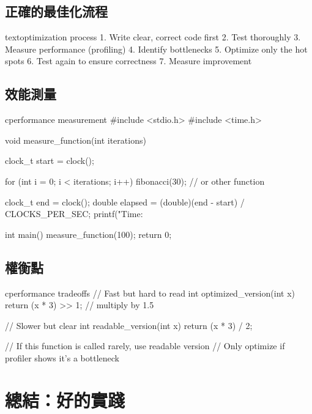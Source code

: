 \subsection*{正確的最佳化流程}

\begin{code}{text}{optimization process}
1. Write clear, correct code first
2. Test thoroughly
3. Measure performance (profiling)
4. Identify bottlenecks
5. Optimize only the hot spots
6. Test again to ensure correctness
7. Measure improvement
\end{code}

\subsection*{效能測量}

\begin{code}{c}{performance measurement}
#include <stdio.h>
#include <time.h>

void measure_function(int iterations) {
    clock_t start = clock();

    for (int i = 0; i < iterations; i++) {
        fibonacci(30);  // or other function
    }

    clock_t end = clock();
    double elapsed = (double)(end - start) / CLOCKS_PER_SEC;
    printf("Time: %
}

int main() {
    measure_function(100);
    return 0;
}
\end{code}

\subsection*{權衡點}

\begin{code}{c}{performance tradeoffs}
// Fast but hard to read
int optimized_version(int x) {
    return (x * 3) >> 1;  // multiply by 1.5
}

// Slower but clear
int readable_version(int x) {
    return (x * 3) / 2;
}

// If this function is called rarely, use readable version
// Only optimize if profiler shows it's a bottleneck
\end{code}


\section{總結：好的實踐}

